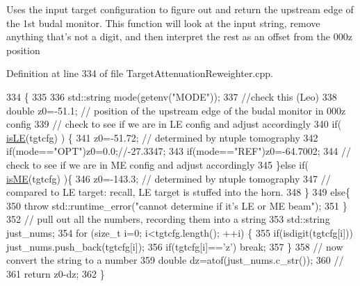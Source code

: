 Uses the input target configuration to figure out and return the upstream edge of the 1st budal monitor. This function will look at the input string, remove anything that's not a digit, and then interpret the rest as an offset from the 000z position 

Definition at line 334 of file Target\-Attenuation\-Reweighter.\-cpp.


\begin{DoxyCode}
334                                                                          \{
335   
336      std::string mode(getenv(\textcolor{stringliteral}{"MODE"}));
337     \textcolor{comment}{//check this (Leo)}
338     \textcolor{keywordtype}{double} z0=-51.1; \textcolor{comment}{// position of the upstream edge of the budal monitor in 000z config}
339     \textcolor{comment}{// check to see if we are in LE config and adjust accordingly}
340     \textcolor{keywordflow}{if}( \hyperlink{class_neutrino_flux_reweight_1_1_target_attenuation_reweighter_a675884a2ca166868e55bb1d6c2eac321}{isLE}(tgtcfg) ) \{
341       z0=-51.72; \textcolor{comment}{// determined by ntuple tomography}
342       \textcolor{keywordflow}{if}(mode==\textcolor{stringliteral}{"OPT"})z0=0.0;\textcolor{comment}{//-27.3347;  }
343       \textcolor{keywordflow}{if}(mode==\textcolor{stringliteral}{"REF"})z0=-64.7002;
344       \textcolor{comment}{// check to see if we are in ME config and adjust accordingly}
345     \}\textcolor{keywordflow}{else} \textcolor{keywordflow}{if}( \hyperlink{class_neutrino_flux_reweight_1_1_target_attenuation_reweighter_a92d081ff9e771a79919287fba68b7a94}{isME}(tgtcfg) )\{ 
346       z0=-143.3; \textcolor{comment}{// determined by ntuple tomography}
347       \textcolor{comment}{// compared to LE target: recall, LE target is stuffed into the horn.}
348     \}
349     \textcolor{keywordflow}{else}\{
350       \textcolor{keywordflow}{throw} std::runtime\_error(\textcolor{stringliteral}{"cannot determine if it's LE or ME beam"});
351     \}
352     \textcolor{comment}{// pull out all the numbers, recording them into a string}
353     std::string just\_nums;
354     \textcolor{keywordflow}{for} (\textcolor{keywordtype}{size\_t} i=0; i<tgtcfg.length(); ++i) \{
355       \textcolor{keywordflow}{if}(isdigit(tgtcfg[i])) just\_nums.push\_back(tgtcfg[i]);
356       \textcolor{keywordflow}{if}(tgtcfg[i]==\textcolor{charliteral}{'z'}) \textcolor{keywordflow}{break};
357     \}
358     \textcolor{comment}{// now convert the string to a number}
359     \textcolor{keywordtype}{double} dz=atof(just\_nums.c\_str());
360     \textcolor{comment}{//}
361     \textcolor{keywordflow}{return} z0-dz;
362   \}
\end{DoxyCode}


